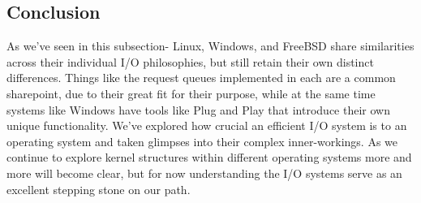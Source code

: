 \subsection{Conclusion}
As we've seen in this subsection- Linux, Windows, and FreeBSD share similarities across their individual I/O philosophies, but still retain their own distinct differences.
Things like the request queues implemented in each are a common sharepoint, due to their great fit for their purpose, while at the same time systems like Windows have tools like Plug and Play that introduce their own unique functionality.
We've explored how crucial an efficient I/O system is to an operating system and taken glimpses into their complex inner-workings.
As we continue to explore kernel structures within different operating systems more and more will become clear, but for now understanding the I/O systems serve as an excellent stepping stone on our path.
